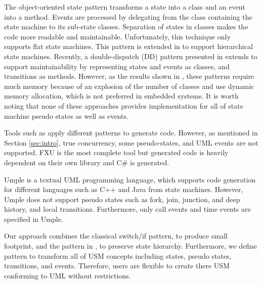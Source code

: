 The object-oriented state pattern \cite{Shalyto2006,Douglass1999} transforms a state into a class and an event into a method. 
Events are processed by delegating from the class containing the state machine to its sub-state classes. 
Separation of states in classes makes the code more readable and maintainable. Unfortunately, this technique only supports flat state machines. 
This pattern is extended in \cite{niaz_mapping_2004} to support hierarchical state machines. 
Recently, a double-dispatch (DD) pattern presented in \cite{spinke_object-oriented_2013} extends \cite{niaz_mapping_2004} to support maintainability by %
representing states and events as classes, and transitions as methods. 
However, as the results shown in \cite{spinke_object-oriented_2013}, these patterns require much memory because of an explosion of the number of classes and use dynamic memory allocation, which is not preferred in embedded systems.
It is worth noting that none of these approaches provides implementation for all of state machine pseudo states as well as events.

Tools such as \cite{sparxsystems_enterprise_2014,ibm_rhapsody} apply different patterns to generate code. 
However, as mentioned in Section \ref{sec:intro}, true concurrency, some pseudo-states, and UML events are not supported. 
FXU \cite{Pilitowski2007} is the most complete tool but generated code is heavily dependent on their own library and C\# is generated.

Umple \cite{Badreddin2014} is a textual UML programming language, which supports code generation for different languages such as C++ and Java from state machines.
However, Umple does not support pseudo states such as fork, join, junction, and deep history, and local transitions.
Furthermore, only call events and time events are specified in Umple.

Our approach combines the classical switch/if pattern, to produce small footprint, and the pattern in \cite{niaz_mapping_2004}, to preserve state hierarchy.
Furthermore, we define pattern to transform all of USM concepts including states, pseudo states, transitions, and events.
Therefore, users are flexible to create there USM conforming to UML without restrictions.

